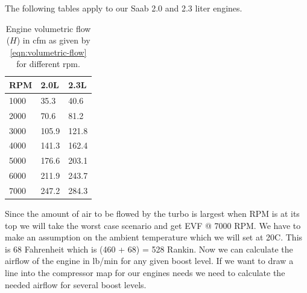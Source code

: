 \documentclass[11pt,a4paper]{book}
\begin{document}
The following tables apply to our Saab 2.0 and 2.3 liter engines.
\begin{table}
    \centering
    \begin{tabular}{lll}
    RPM & 2.0L & 2.3L \\
    \midrule
1000 & 35.3 &40.6 \\
2000 & 70.6 &81.2  \\
3000 & 105.9 &121.8 \\
4000 & 141.3 &162.4 \\
5000 & 176.6 &203.1 \\
6000 & 211.9 &243.7 \\
7000 & 247.2 &284.3
    \end{tabular}
    \caption{Engine volumetric flow ($H$) in cfm as given by \cref{eqn:volumetric-flow}
    for different rpm.}
    \label{tab:volumetric-flow-rpm}
\end{table}
Since the amount of air to be flowed by the turbo is largest when RPM is at its
top we will take the worst case scenario and get EVF @ 7000 RPM. We have to make
an assumption on the ambient temperature which we will set at 20C. This is 68
Fahrenheit which is (460 + 68) = 528 Rankin. Now we can calculate the airflow of
the engine in lb/min for any given boost level. If we want to draw a line into
the compressor map for our engines needs we need to calculate the needed airflow
for several boost levels.

\begin{table}
    \centering
    \begin{tabular}{lllll}

    \end{tabular}
    \caption{}
    \label{tab:airflow-rpm}
\end{table}

\printindex

\printbibliography
\end{document}
